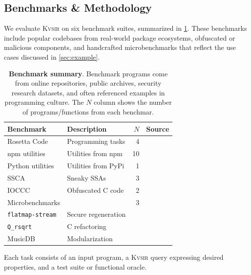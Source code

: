 \documentclass[noacm,sigplan]{acmart}
\newcommand{\sys}{{\scshape Kv{\textalpha}sir}\xspace}
\newcommand{\ttt}[1]{\texttt{#1}\xspace}
\begin{document}
\subsection{Benchmarks \& Methodology}

We evaluate \sys on six benchmark suites, summarized in \cref{tab:benchmarks}.
These benchmarks include popular codebases from real-world package ecosystems, obfuscated or malicious components, and handcrafted microbenchmarks that reflect the use cases discussed in \cref{sec:example}.

\begin{table}[h]
\centering
  \caption{\textbf{Benchmark summary}. 
  Benchmark programs come from online repositories, public archives, security research datasets, and often referenced examples in programming culture.
  The $N$ column shows the number of programs/functions from each benchmar.
  }
\begin{tabular}{llrl}
\toprule
Benchmark                          & Description         & $N$ & Source \\
\midrule
Rosetta Code                       & Programming tasks   & 4   & \cite{rosettacode} \\
npm utilities                      & Utilities from npm  & 10  & \cite{regbench2025} \\
Python utilities                   & Utilities from PyPi & 1   & \cite{regbench2025} \\
SSCA                               & Sneaky SSAs         & 3   & \cite{ev:eurosec:2022, es1, ohm2020backstabber} \\
IOCCC                              & Obfuscated C code   & 2   & \cite{ioccc} \\
Microbenchmarks                    &                     & 3   & \\
\hspace{.5em} \ttt{flatmap-stream} & Secure regeneration &     & \cite{es1}  \\
\hspace{.5em} \ttt{Q\_rsqrt}       & C refactoring       &     & \cite{fast_inv_sqrt}  \\
\hspace{.5em} \textsf{MusicDB}     & Modularization      &     & \cite{codewithsadeemusicplayer} \\
\bottomrule
\end{tabular}
\label{tab:benchmarks}
\end{table}

Each task consists of an input program, a \sys query expressing desired properties, and a test suite or functional oracle.
\end{document}
